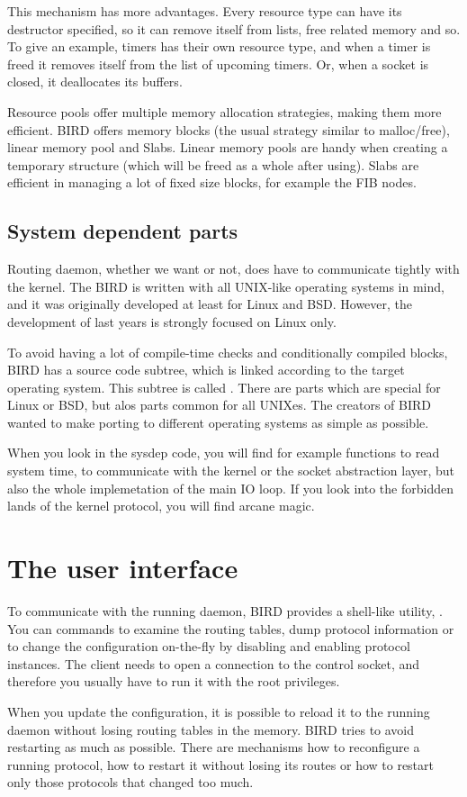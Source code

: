 This mechanism has more advantages. Every resource type can have its destructor
specified, so it can remove itself from lists, free related memory and so. To
give an example, timers has their own resource type, and when a timer is freed
it removes itself from the list of upcoming timers. Or, when a socket is
closed, it deallocates its buffers.

Resource pools offer multiple memory allocation strategies, making them more
efficient. BIRD offers memory blocks (the usual strategy similar to
malloc/free), linear memory pool and Slabs. Linear memory pools are handy when
creating a temporary structure (which will be freed as a whole after using).
Slabs are efficient in managing a lot of fixed size blocks, for example the FIB
nodes.

\subsection{System dependent parts}
Routing daemon, whether we want or not, does have to communicate tightly with
the kernel. The BIRD is written with all UNIX-like operating systems in mind,
and it was originally developed at least for Linux and BSD. However, the
development of last years is strongly focused on Linux only.

To avoid having a lot of compile-time checks and conditionally compiled blocks,
BIRD has a source code subtree, which is linked according to the target
operating system. This subtree is called . There are parts which
are special for Linux or BSD, but alos parts common for all UNIXes. The
creators of BIRD wanted to make porting to different operating systems as
simple as possible.

When you look in the sysdep code, you will find for example functions to read
system time, to communicate with the kernel or the socket abstraction layer,
but also the whole implemetation of the main IO loop. If you look into the
forbidden lands of the kernel protocol, you will find arcane magic.

\section{The user interface}
To communicate with the running daemon, BIRD provides a shell-like utility,
. You can commands to examine the routing tables, dump protocol
information or to change the configuration on-the-fly by disabling and enabling
protocol instances. The client needs to open a connection to the control
socket, and therefore you usually have to run it with the root privileges.

When you update the configuration, it is possible to reload it to the running
daemon without losing routing tables in the memory. BIRD tries to avoid
restarting as much as possible. There are mechanisms how to reconfigure
a running protocol, how to restart it without losing its routes or how to
restart only those protocols that changed too much.
